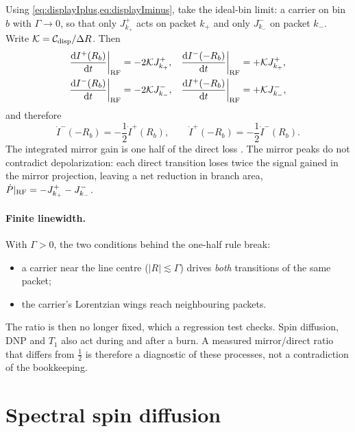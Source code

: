 \documentclass[11pt]{article}
\newcommand{\Iplus}{I^{+}}
\newcommand{\Iminus}{I^{-}}
\newcommand{\dd}{\mathrm{d}}
\begin{document}
Using \cref{eq:displayIplus,eq:displayIminus}, take the ideal-bin limit: a carrier on bin \(b\)
with \(\Gamma\to0\), so that only \(J^+_{k_+}\) acts on packet \(k_+\) and only \(J^-_{k_-}\) on
packet \(k_-\). Write \(\mathcal K=\mathcal C_{\rm disp}/\Delta R\). Then
\begin{align}
  \frac{\dd\Iplus(R_b)}{\dd t}\bigg|_{\rm RF}
  &=-2\mathcal K J^+_{k_+},
  &\frac{\dd\Iminus(-R_b)}{\dd t}\bigg|_{\rm RF}
  &=+\mathcal K J^+_{k_+},
  \label{eq:directplus}\\
  \frac{\dd\Iminus(R_b)}{\dd t}\bigg|_{\rm RF}
  &=-2\mathcal K J^-_{k_-},
  &\frac{\dd\Iplus(-R_b)}{\dd t}\bigg|_{\rm RF}
  &=+\mathcal K J^-_{k_-},
  \label{eq:directminus}
\end{align}
and therefore
\begin{equation}
  \dot\Iminus(-R_b)=-\frac12\dot\Iplus(R_b),\qquad
  \dot\Iplus(-R_b)=-\frac12\dot\Iminus(R_b).
  \label{eq:halfgain}
\end{equation}
The integrated mirror gain is one half of the direct loss \cite{ClementKeller2023}. The mirror
peaks do not contradict depolarization: each direct transition loses twice the signal gained in
the mirror projection, leaving a net reduction in branch area,
\(\dot P|_{\rm RF}=-J^+_{k_+}-J^-_{k_-}\).

\paragraph{Finite linewidth.} With \(\Gamma>0\), the two conditions behind the one-half rule
break:
\begin{itemize}
\item a carrier near the line centre (\(|R|\lesssim\Gamma\)) drives \emph{both} transitions of the
same packet;
\item the carrier's Lorentzian wings reach neighbouring packets.
\end{itemize}
The ratio is then no longer fixed, which a regression test checks. Spin diffusion,
DNP and \(T_1\) also act during and after a burn. A measured mirror/direct ratio that differs from
\(\tfrac12\) is therefore a diagnostic of these processes, not a contradiction of the bookkeeping.

\section{Spectral spin diffusion}
\label{sec:diffusion}
\end{document}
